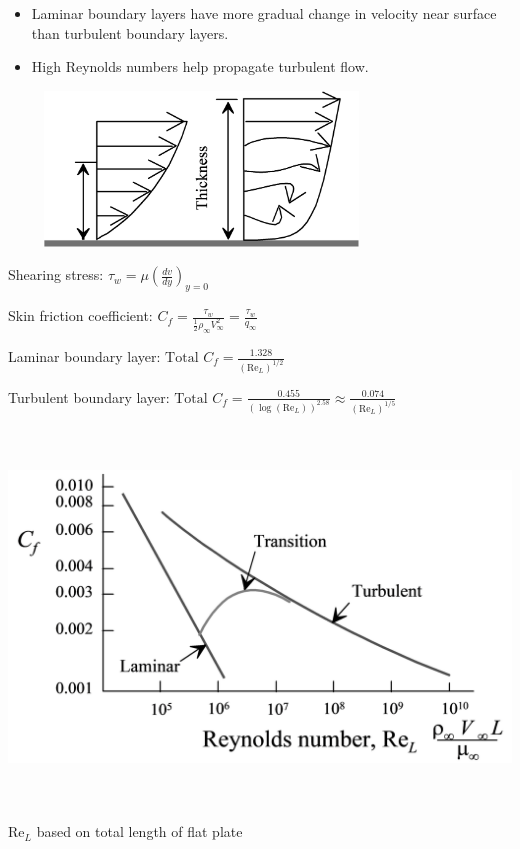 \documentclass[
]{book}
\providecommand{\tightlist}{%
  \setlength{\itemsep}{0pt}\setlength{\parskip}{0pt}}
\begin{document}
\begin{itemize}
\tightlist
\item
  Laminar boundary layers have more gradual change in velocity near surface than turbulent boundary layers.
\item
  High Reynolds numbers help propagate turbulent flow.
\end{itemize}

\includegraphics[width=4.033in,height=1.625in]{media/05/image38.svg}

Shearing stress: \(\tau_w = \mu \left(\frac{dv}{dy}\right)_{y=0}\)

Skin friction coefficient: \(C_f = \frac{\tau_w}{\frac{1}{2}\rho_{\infty} V_{\infty}^2} = \frac{\tau_w}{q_{\infty}}\)

Laminar boundary layer: \(\text{Total } C_f = \frac{1.328}{\left(\mathrm{Re}_L \right)^{1/2}}\)

Turbulent boundary layer: \(\text{Total } C_f = \frac{0.455}{\left(\log(\mathrm{Re}_L)\right)^{2.58}} \approx \frac{0.074}{\left(\mathrm{Re}_L\right)^{1/5}}\)

\includegraphics[width=6.699in,height=3.906in]{media/05/image43.svg}

\(\mathrm{Re}_L\) based on total length of flat plate
\end{document}
